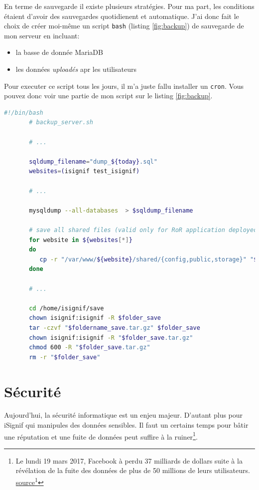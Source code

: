 \documentclass[]{report}
\newcommand\fnurl[2]{%
  \href{#1}{#2}\footnote{\url{#1}}%
}
\begin{document}
    En terme de sauvegarde il existe plusieurs stratégies. Pour ma part, les conditions étaient d'avoir des sauvegardes quotidienent et automatique. J'ai donc fait le choix de créer moi-même un script \verb|bash| (listing \ref{fig:backup}) de sauvegarde de mon serveur en incluant:

    \begin{itemize}
      \item la basse de donnée MariaDB
      \item les données \textit{uploadés} apr les utilisateurs
    \end{itemize}

    Pour executer ce script tous les jours, il m'a juste fallu installer un \verb|cron|. Vous pouvez donc voir une partie de mon script sur le listing \ref{fig:backup}.

     \begin{scriptsize}
       \begin{lstlisting}[language=bash, label={fig:backup}, caption={Script de sauvegarde automatique des données du serveur}]
       #!/bin/bash
       # backup_server.sh

       # ...

       sqldump_filename="dump_${today}.sql"
       websites=(isignif test_isignif)

       # ...

       mysqldump --all-databases  > $sqldump_filename

       # save all shared files (valid only for RoR application deployed with Capistrano)
       for website in ${websites[*]}
       do
          cp -r "/var/www/${website}/shared/{config,public,storage}" "${website}/shared/"
       done

       # ...

       cd /home/isignif/save
       chown isignif:isignif -R $folder_save
       tar -czvf "$foldername_save.tar.gz" $folder_save
       chown isignif:isignif -R "$folder_save.tar.gz"
       chmod 600 -R "$folder_save.tar.gz"
       rm -r "$folder_save"
       \end{lstlisting}
     \end{scriptsize}

\chapter{Sécurité}

  Aujourd'hui, la sécurité informatique est un enjeu majeur. D'autant plus pour iSignif qui manipules des données sensibles. Il faut un certains temps pour bâtir une réputation et une fuite de données peut suffire à la ruiner\footnote{Le lundi 19 mars 2017, Facebook à perdu 37 milliards de dollars suite à la révélation de la fuite des données de plus de 50 millions de leurs utilisateurs.  \fnurl{https://www.lci.fr/high-tech/affaire-cambridge-analytica-quel-est-ce-scandale-qui-plonge-facebook-dans-la-crise-mark-zuckerberg-2082228.html}{source}}.
\end{document}
